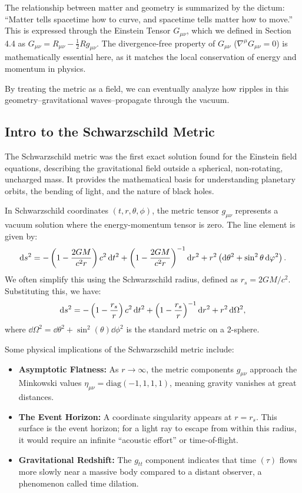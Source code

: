 The relationship between matter and geometry is summarized by the dictum: ``Matter tells spacetime how to curve, and spacetime tells matter how to move.'' This is expressed through the Einstein Tensor $G_{\mu\nu}$, which we defined in Section 4.4 as $G_{\mu\nu} = R_{\mu\nu} - \frac{1}{2}Rg_{\mu\nu}$. The divergence-free property of $G_{\mu\nu}$ ($\nabla^{\mu}G_{\mu\nu} = 0$) is mathematically essential here, as it matches the local conservation of energy and momentum in physics.

By treating the metric as a field, we can eventually analyze how ripples in this geometry--gravitational waves--propagate through the vacuum.

\subsection{Intro to the Schwarzschild Metric} The Schwarzschild metric was the first exact solution found for the Einstein field equations, describing the gravitational field outside a spherical, non-rotating, uncharged mass. It provides the mathematical basis for understanding planetary orbits, the bending of light, and the nature of black holes.

In Schwarzschild coordinates $(t, r, \theta, \phi)$, the metric tensor $g_{\mu\nu}$ represents a vacuum solution where the energy-momentum tensor is zero. The line element is given by:
\[%
  \ds^2 = -\left(1 - \frac{2GM}{c^2r}\right)c^2\dt^2 + \left(1 - \frac{2GM}{c^2r}\right)^{-1}\dr^2 + r^2\left(\dd{\theta}^2 + \sin^2\theta \dd{\phi}^2\right)
.\]%
We often simplify this using the Schwarzschild radius, defined as $r_s = 2GM/c^2$. Substituting this, we have:
\[%
  \ds^2 = -\left(1 - \frac{r_s}{r}\right)c^2\dt^2 + \left(1 - \frac{r_s}{r}\right)^{-1}\dr^2 + r^2\dd{\Omega}^2
,\]%
where $\dd{\Omega}^2 = \dd{\theta}^2 + \sin^2(\theta)\dd{\phi}^2$ is the standard metric on a 2-sphere.

Some physical implications of the Schwarzschild metric include:
\begin{itemize}
  \item \textbf{Asymptotic Flatness:} As $r \to \infty$, the metric components $g_{\mu\nu}$ approach the Minkowski values $\eta_{\mu\nu} = \text{diag}(-1, 1, 1, 1)$, meaning gravity vanishes at great distances.
  \item \textbf{The Event Horizon:} A coordinate singularity appears at $r = r_s$. This surface is the event horizon; for a light ray to escape from within this radius, it would require an infinite ``acoustic effort'' or time-of-flight.
  \item \textbf{Gravitational Redshift:} The $g_{tt}$ component indicates that time $(\tau)$ flows more slowly near a massive body compared to a distant observer, a phenomenon called time dilation.
\end{itemize}

